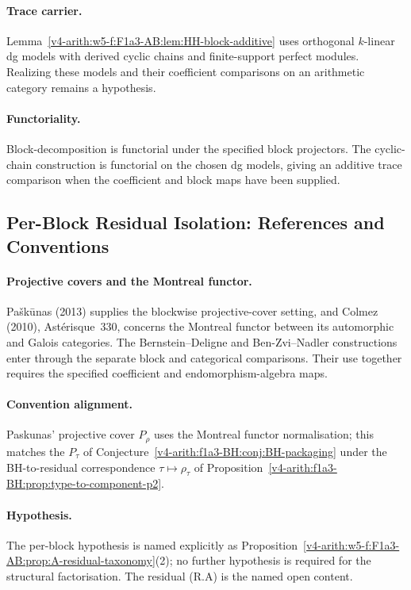 \paragraph{Trace carrier.} Lemma~\ref{v4-arith:w5-f:F1a3-AB:lem:HH-block-additive}
uses orthogonal \(k\)-linear dg models with derived cyclic chains and
finite-support perfect modules. Realizing these models and their
coefficient comparisons on an arithmetic category remains a hypothesis.

\paragraph{Functoriality.} Block-decomposition is functorial under
the specified block projectors. The cyclic-chain construction is
functorial on the chosen dg models, giving an additive trace
comparison when the coefficient and block maps have been supplied.

\subsection{Per-Block Residual Isolation: References and Conventions}
\label{v4-arith:w5-f:F1a3-AB:comparison-per-block}

\paragraph{Projective covers and the Montreal functor.}
Pa{\v s}k{\=u}nas (2013) supplies the blockwise projective-cover
setting, and Colmez (2010), Ast\'erisque~330, concerns the Montreal
functor between its automorphic and Galois categories. The
Bernstein--Deligne and Ben-Zvi--Nadler constructions enter through
the separate block and categorical comparisons. Their use together
requires the specified coefficient and endomorphism-algebra maps.

\paragraph{Convention alignment.} Paskunas' projective cover
\(P_{\rho}\) uses the Montreal functor normalisation; this matches the
\(P_{\tau}\) of Conjecture~\ref{v4-arith:f1a3-BH:conj:BH-packaging} under the
BH-to-residual correspondence
\(\tau\mapsto\rho_{\tau}\) of
Proposition~\ref{v4-arith:f1a3-BH:prop:type-to-component-p2}.

\paragraph{Hypothesis.} The per-block hypothesis is named explicitly as
Proposition~\ref{v4-arith:w5-f:F1a3-AB:prop:A-residual-taxonomy}(2); no further
hypothesis is required for the structural factorisation. The residual
(R.A) is the named open content.

